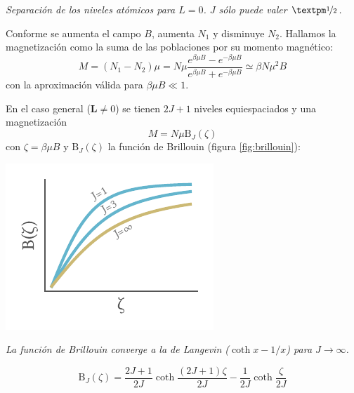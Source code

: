 \documentclass{tufte-book}
\newcommand{\oh}{{\nicefrac{1}{2}} }
\newcommand{\moh}{{\nicefrac{-1}{2}} }
\begin{document}
\begin{marginfigure}
  \centering
  \caption{\itshape Separación de los niveles atómicos para $L=0$. $J$
    sólo puede valer $±\oh$.}
  \label{fig:twolevelM}
\end{marginfigure}

Conforme se aumenta el campo $B$, aumenta $N_1$ y disminuye $N_2$.
Hallamos la magnetización como la suma de las poblaciones por su momento
magnético:
\begin{equation}
  M = (N_1 - N_2)μ = N μ \frac{e^{βμB} - e^{-βμB}}{e^{βμB} + e^{-βμB}}
  ≃ βNμ^2B
  \label{eq:simple}
\end{equation}
con la aproximación válida para $βμB ≪ 1$.

En el caso general ($\symbf{L}≠0$) se tienen $2J+1$ niveles
equiespaciados y una magnetización
\begin{equation}
  M = Nμ \text{B}_J(ζ)
\end{equation}
con $ζ=βμB$ y $\text{B}_J(ζ)$ la función de Brillouin (figura \ref{fig:brillouin}):
\begin{marginfigure}
  \centering
  \includegraphics{figures/brillouin.pdf}
  \caption{\itshape La función de Brillouin converge a la de Langevin ($\coth x
    - 1/x$) para $J→∞$.}
  \label{fig:brillouin}
\end{marginfigure}
\begin{equation}
  \text{B}_J(ζ) = \frac{2J+1}{2J} \coth \frac{(2J+1)ζ}{2J} -
  \frac{1}{2J} \coth \frac{ζ}{2J}
\end{equation}
\end{document}
